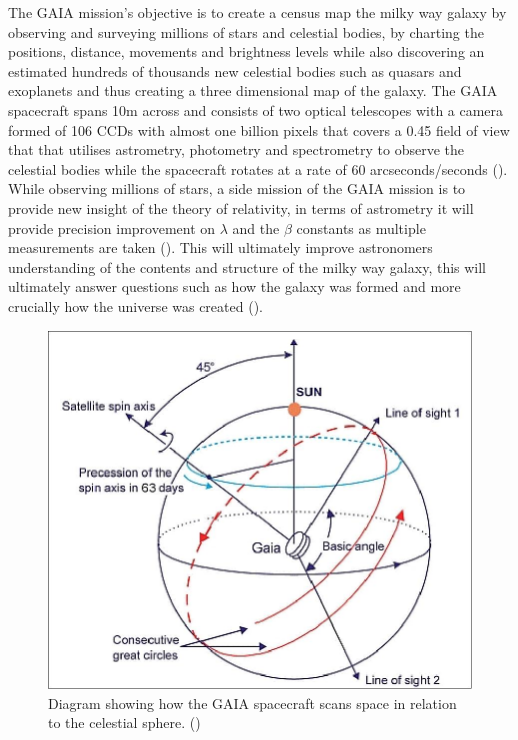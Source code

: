 \documentclass[12pt]{article}
\begin{document}
The GAIA mission's objective is to create a census map the milky way galaxy by observing and surveying millions of stars and celestial bodies, by charting the positions, distance, movements and brightness levels while also discovering an estimated hundreds of thousands new celestial bodies such as quasars and exoplanets and thus creating a three dimensional map of the galaxy. The GAIA spacecraft spans 10m across and consists of two optical telescopes with a camera formed of 106 CCDs with almost one billion pixels that covers a 0.45 field of view that that utilises astrometry, photometry and spectrometry to observe the celestial bodies while the spacecraft rotates at a rate of 60 arcseconds/seconds (\cite{GAIA}). \\ 

While observing millions of stars, a side mission of the GAIA mission is to provide new insight of the theory of relativity, in terms of astrometry it will provide precision improvement on $\lambda$ and the $\beta$ constants as multiple measurements are taken (\cite{General}). This will ultimately improve astronomers understanding of the contents and structure of the milky way galaxy, this will ultimately answer questions such as how the galaxy was formed and more crucially how the universe was created (\cite{over}). \\

\begin{figure}[H]
\centering
\includegraphics[scale=0.4]{Images/S3/Gaia.jpg}
\caption{Diagram showing how the GAIA spacecraft scans space in relation to the celestial sphere. (\cite{gaiaimage})}
\label{gaia image}
\end{figure}
\end{document}
